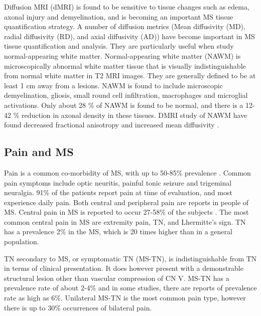 Diffusion MRI (dMRI) is found to be sensitive to tissue changes such as edema, axonal injury and demyelination, and is becoming an important MS tissue quantification strategy. A number of diffusion metrics (Mean diffusivity (MD), radial diffusivity (RD), and axial diffusivity (AD)) have become important in MS tissue quantification and analysis.  They are particularly useful when study normal-appearing white matter. Normal-appearing white matter (NAWM) is microscopically abnormal white matter tissue that is visually indistinguishable from normal white matter in T2 MRI images. They are generally defined to be at least 1 cm away from a lesions. NAWM is found to include microscopic demyelination, gliosis, small round cell infiltration, macrophages and microglial activations. Only about 28 \% of NAWM is found to be normal, and there is a 12-42 \% reduction in axonal density in these tissues. DMRI study of NAWM have found decreased fractional anisotropy and increased mean diffusivity \cite{Ciccarelli2003d,DeGroot2013}.  

\subsection{Pain and MS}
Pain is a common co-morbidity of MS, with up to 50-85\% prevalence \cite{Osterberg2005}. Common pain symptoms include optic neuritis, painful tonic seizure and trigeminal neuralgia. 91\% of the patients report pain at time of evaluation, and most experience daily pain. Both central and peripheral pain are reports in people of MS. Central pain in MS is reported to occur 27-58\% of the subjects \cite{O'Connor2008}. The most common central pain in MS are extremity pain, TN, and Lhermitte’s sign. TN has a prevalence 2\% in the MS, which is 20 times higher than in a general population.

TN secondary to MS, or symptomatic TN (MS-TN), is indistinguishable from TN in terms of clinical presentation. It does however present with a demonstrable structural lesion other than vascular compression of CN V. MS-TN has a prevalence rate of about 2-4\% and in some studies, there are reports of prevalence rate as high as 6\%. Unilateral MS-TN is the most common pain type, however there is up to 30\% occurrences of bilateral pain. 

